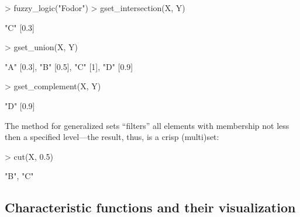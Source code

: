 \documentclass[article]{jss}
\newcommand{\codefun}[1]{\code{#1()}}
\newcommand{\dQuote}[1]{``{#1}''}
\begin{document}
\begin{Schunk}
\begin{Sinput}
> fuzzy_logic("Fodor")
> gset_intersection(X, Y)
\end{Sinput}
\begin{Soutput}
{"C" [0.3]}
\end{Soutput}
\begin{Sinput}
> gset_union(X, Y)
\end{Sinput}
\begin{Soutput}
{"A" [0.3], "B" [0.5], "C" [1], "D" [0.9]}
\end{Soutput}
\begin{Sinput}
> gset_complement(X, Y)
\end{Sinput}
\begin{Soutput}
{"D" [0.9]}
\end{Soutput}
\end{Schunk}
The \codefun{cut} method for generalized sets
\dQuote{filters} all elements with membership
not less then a specified level---the result, thus, is a crisp (multi)set:
\begin{Schunk}
\begin{Sinput}
> cut(X, 0.5)
\end{Sinput}
\begin{Soutput}
{"B", "C"}
\end{Soutput}
\end{Schunk}

\subsection{Characteristic functions and their visualization}
\label{sec:plots}
\end{document}
